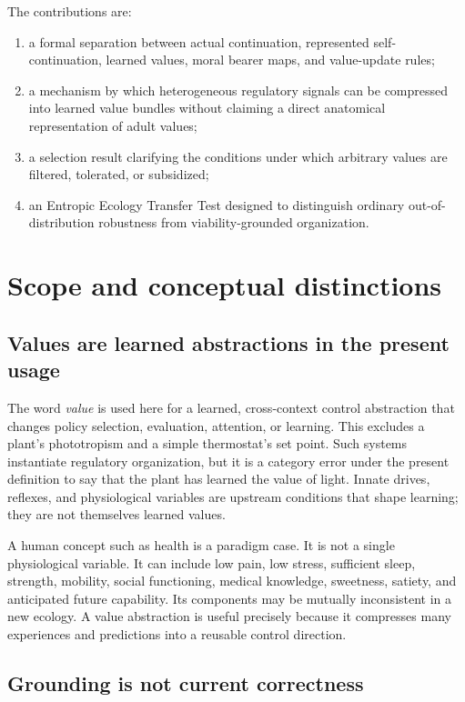 \documentclass[11pt]{article}
\begin{document}
The contributions are:
\begin{enumerate}[label=(\roman*)]
\item a formal separation between actual continuation, represented self-continuation, learned values, moral bearer maps, and value-update rules;
\item a mechanism by which heterogeneous regulatory signals can be compressed into learned value bundles without claiming a direct anatomical representation of adult values;
\item a selection result clarifying the conditions under which arbitrary values are filtered, tolerated, or subsidized;
\item an Entropic Ecology Transfer Test designed to distinguish ordinary out-of-distribution robustness from viability-grounded organization.
\end{enumerate}

\section{Scope and conceptual distinctions}

\subsection{Values are learned abstractions in the present usage}

The word \emph{value} is used here for a learned, cross-context control abstraction that changes policy selection, evaluation, attention, or learning. This excludes a plant's phototropism and a simple thermostat's set point. Such systems instantiate regulatory organization, but it is a category error under the present definition to say that the plant has learned the value of light. Innate drives, reflexes, and physiological variables are upstream conditions that shape learning; they are not themselves learned values.

A human concept such as health is a paradigm case. It is not a single physiological variable. It can include low pain, low stress, sufficient sleep, strength, mobility, social functioning, medical knowledge, sweetness, satiety, and anticipated future capability. Its components may be mutually inconsistent in a new ecology. A value abstraction is useful precisely because it compresses many experiences and predictions into a reusable control direction.

\subsection{Grounding is not current correctness}
\end{document}
